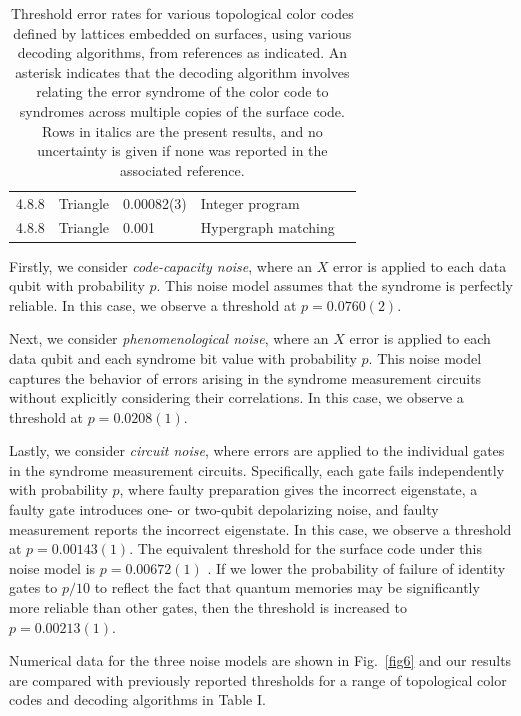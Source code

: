 \documentclass[letterpaper,showpacs,superscriptaddress,twocolumn,aps,prl]{revtex4-1}
\begin{document}
\begin{table}
\begin{center}
\begin{tabular}{llllc}
\hline
4.8.8 & Triangle & 0.00082(3) & Integer program & \cite{Landahl1} \\
4.8.8 & Triangle & 0.001 & Hypergraph matching & \cite{Wang10} \\ 
\hline\hline
\end{tabular}
\vspace{2pt} 
\caption{Threshold error rates for various topological color codes defined by lattices embedded on surfaces, using various decoding algorithms, from references as indicated. An asterisk indicates that the decoding algorithm involves relating the error syndrome of the color code to syndromes across multiple copies of the surface code. Rows in italics are the present results, and no uncertainty is given if none was reported in the associated reference.}
\label{tab1}
\end{center}
\end{table}

Firstly, we consider {\it code-capacity noise}, where an $X$ error is applied to each data qubit with probability $p$. This noise model assumes that the syndrome is perfectly reliable. In this case, we observe a threshold at $p=0.0760(2)$.

Next, we consider {\it phenomenological noise}, where an $X$ error is applied to each data qubit and each syndrome bit value with probability $p$. This noise model captures the behavior of errors arising in the syndrome measurement circuits without explicitly considering their correlations. In this case, we observe a threshold at $p=0.0208(1)$.

Lastly, we consider {\it circuit noise}, where errors are applied to the individual gates in the syndrome measurement circuits. Specifically, each gate fails independently with probability $p$, where faulty preparation gives the incorrect eigenstate, a faulty gate introduces one- or two-qubit depolarizing noise, and faulty measurement reports the incorrect eigenstate. In this case, we observe a threshold at $p=0.00143(1)$. The equivalent threshold for the surface code under this noise model is $p=0.00672(1)$  \cite{Stephens13}. If we lower the probability of failure of identity gates to $p/10$ to reflect the fact that quantum memories may be significantly more reliable than other gates, then the threshold is increased to $p=0.00213(1)$.

Numerical data for the three noise models are shown in Fig.~\ref{fig6} and our results are compared with previously reported thresholds for a range of topological color codes and decoding algorithms in Table I.
\end{document}
